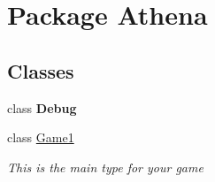 \hypertarget{namespace_athena}{\section{Package Athena}
\label{namespace_athena}
}
\subsection*{Classes}
\begin{DoxyCompactItemize}
\item 
class {\bfseries Debug}
\item 
class \hyperlink{class_athena_1_1_game1}{Game1}
\begin{DoxyCompactList}\small\item\em This is the main type for your game \end{DoxyCompactList}\end{DoxyCompactItemize}
